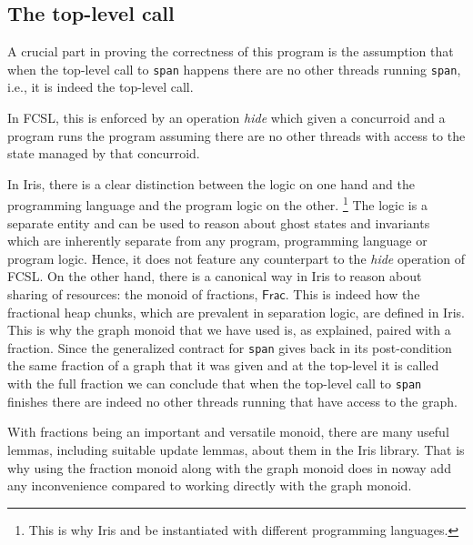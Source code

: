 \documentclass[]{scrartcl}
\def\MyMLe{\lstinline[language=MyML, basicstyle=\small\ttfamily, mathescape=true]}
\newcommand{\Frac}{\textsf{Frac}}
\begin{document}
\subsection{The top-level call}
A crucial part in proving the correctness of this program is the
assumption that when the top-level call to \MyMLe{span} happens there are
no other threads running \MyMLe|span|, i.e., it is indeed the top-level call.

In FCSL, this is enforced by an operation \textit{hide} which given a
concurroid and a program runs the program assuming there are no
other threads with access to the state managed by that concurroid.

In Iris, there is a clear distinction between the logic on one hand and the programming
language and the program logic on the other.%
\footnote{This is why Iris and be instantiated with different programming languages.}
The logic is a separate entity and can be used to reason about ghost states and invariants
which are inherently separate from any program, programming language or program logic.
Hence, it does not feature any counterpart to the \textit{hide} operation of FCSL.
On the other hand, there is a canonical way in Iris to reason about sharing of resources:
the monoid of fractions, $\Frac$.
This is indeed how the fractional heap chunks, which are prevalent in separation logic, are
defined in Iris.
This is why the graph monoid that we have used is, as explained, paired with a fraction.
Since the generalized contract for \MyMLe|span| gives back in its
post-condition the same fraction of a graph that it was given and at
the top-level it is called with the full fraction we can conclude that
when the top-level call to \MyMLe|span| finishes there are indeed no
other threads running that have access to the graph.

With fractions being an important and versatile monoid, there are many useful lemmas,
including suitable update lemmas, about them in the Iris library.
That is why using the fraction monoid along with the graph monoid does in noway add any inconvenience compared to working directly with the graph monoid.
\end{document}
